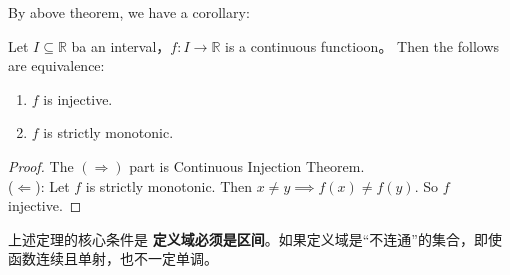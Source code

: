 \documentclass[
	UTF-8,
	11pt, %
	a4paper, %
]{LegrandOrangeBook}
\begin{document}
    \newpage

    By above theorem, we have a corollary:

    \begin{corollary}
        Let $I \subseteq \mathbb{R}$ ba an interval，$f: I \to \mathbb{R}$ is a continuous functioon。
        Then the follows are equivalence:
        \begin{enumerate}
            \item $f$ is injective.
            \item $f$ is strictly monotonic.
        \end{enumerate}
    \end{corollary}

    \begin{proof}
        The  $(\Rightarrow)$ part is Continuous Injection Theorem.\\

        ($\Leftarrow$): Let $f$ is strictly monotonic. Then $x \ne y \implies f(x) \ne f(y)$. 
        So $f$ injective.
    \end{proof}

    \begin{remark}
        上述定理的核心条件是 \textbf{定义域必须是区间}。如果定义域是“不连通”的集合，即使函数连续且单射，也不一定单调。
    \end{remark}
\end{document}
